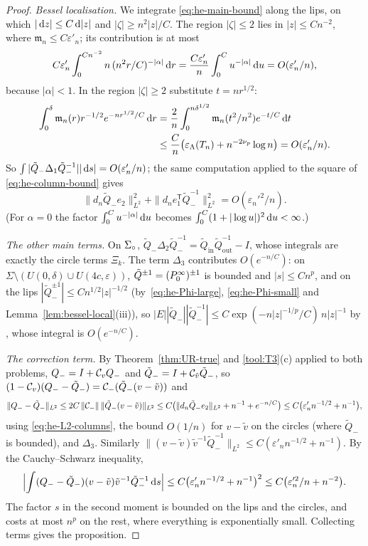 \begin{proof}
\emph{Bessel localisation.} We integrate \eqref{eq:he-main-bound} along the lips, on which $|\,\mathrm{d} z|\le C\,\mathrm{d}|z|$ and
$|\zeta|\ge n^2|z|/C$. The region $|\zeta|\le2$ lies in $|z|\le Cn^{-2}$, where $\mathfrak m_n\le C\varepsilon'_n$; its
contribution is at most
\[
  C\varepsilon'_n\int_0^{Cn^{-2}}n\,(n^2r/C)^{-|\alpha|}\,\mathrm{d} r=\frac{C\varepsilon'_n}{n}\int_0^{C}u^{-|\alpha|}\,\mathrm{d} u
  =O(\varepsilon'_n/n),
\]
because $|\alpha|<1$. In the region $|\zeta|\ge2$ substitute $t=nr^{1/2}$:
\begin{align*}
  \int_0^\delta\mathfrak m_n(r)r^{-1/2}e^{-nr^{1/2}/C}\,\mathrm{d} r&=\frac2n\int_0^{n\delta^{1/2}}\mathfrak m_n(t^2/n^2)e^{-t/C}\,\mathrm{d} t\\
  &\le\frac Cn\bigl(\varepsilon_\Lambda(T_n)+n^{-2\nu_p}\log n\bigr)=O(\varepsilon'_n/n).
\end{align*}
So $\int|\tilde Q_-\Delta_1\tilde Q_-^{-1}||\,\mathrm{d} s|=O(\varepsilon'_n/n)$; the same computation applied to the square of
\eqref{eq:he-column-bound} gives
\begin{equation}\label{eq:he-L2-columns}
  \|d_n\tilde Q_-e_2\|_{L^2}^2+\|d_ne_1^{\mathsf T}\tilde Q_-^{-1}\|_{L^2}^2=O(\varepsilon_n'^2/n).
\end{equation}
(For $\alpha=0$ the factor $\int_0^Cu^{-|\alpha|}\,\mathrm{d} u$ becomes $\int_0^C(1+|\log u|)^2\,\mathrm{d} u<\infty$.)

\emph{The other main terms.} On $\Sigma_{\circ}$, $\tilde Q_-\Delta_2\tilde Q_-^{-1}=\tilde Q_{\mathrm{in}}\tilde
Q_{\mathrm{out}}^{-1}-I$, whose integrals are exactly the circle terms $\Xi_k$. The term $\Delta_3$ contributes
$O(e^{-n/C})$: on $\Sigma\setminus(U(0,\delta)\cup U(4c,\varepsilon))$, $\tilde Q^{\pm1}=(P^\infty_0)^{\pm1}$ is bounded and
$|s|\le Cn^p$, and on the lips $|\tilde Q_-^{\pm1}|\le Cn^{1/2}|z|^{-1/2}$ (by~\eqref{eq:he-Phi-large}, \eqref{eq:he-Phi-small} and
Lemma~\ref{lem:bessel-local}(iii)), so $|E||\tilde Q_-||\tilde Q_-^{-1}|\le C\exp(-n|z|^{-1/p}/C)\,n|z|^{-1}$ by , whose integral is
$O(e^{-n/C})$.

\emph{The correction term.} By Theorem~\ref{thm:UR-true} and \ref{tool:T3}(c) applied to both problems, $Q_-=I+\mathcal{C}_v
Q_-$ and $\tilde Q_-=I+\mathcal{C}_{\tilde v}\tilde Q_-$, so $(1-\mathcal{C}_v)(Q_--\tilde Q_-)=\mathcal{C}_-(\tilde Q_-(v-\tilde v))$ and
\[
  \|Q_--\tilde Q_-\|_{L^2}\le2C\,\|\mathcal{C}_-\|\,\|\tilde Q_-(v-\tilde v)\|_{L^2}
  \le C\bigl(\|d_n\tilde Q_-e_2\|_{L^2}+n^{-1}+e^{-n/C}\bigr)\le C\bigl(\varepsilon'_nn^{-1/2}+n^{-1}\bigr),
\]
using \eqref{eq:he-L2-columns}, the bound $O(1/n)$ for $v-\tilde v$ on the circles (where $\tilde Q_-$ is bounded), and
$\Delta_3$. Similarly $\|(v-\tilde v)\tilde v^{-1}\tilde Q_-^{-1}\|_{L^2}\le C(\varepsilon'_nn^{-1/2}+n^{-1})$. By the
Cauchy--Schwarz inequality,
\[
  \Bigl|\int(Q_--\tilde Q_-)(v-\tilde v)\tilde v^{-1}\tilde Q_-^{-1}\,\mathrm{d} s\Bigr|\le C\bigl(\varepsilon'_nn^{-1/2}+n^{-1}\bigr)^2
  \le C\bigl(\varepsilon_n'^2/n+n^{-2}\bigr).
\]
The factor $s$ in the second moment is bounded on the lips and the circles, and costs at most $n^p$ on the rest, where
everything is exponentially small. Collecting terms gives the proposition.
\end{proof}

